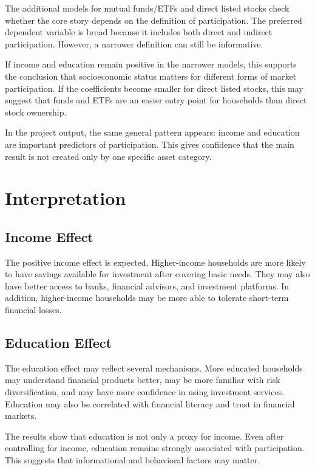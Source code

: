 \documentclass[12pt]{article}
\begin{document}
The additional models for mutual funds/ETFs and direct listed stocks check whether the core story depends on the definition of participation. The preferred dependent variable is broad because it includes both direct and indirect participation. However, a narrower definition can still be informative.

If income and education remain positive in the narrower models, this supports the conclusion that socioeconomic status matters for different forms of market participation. If the coefficients become smaller for direct listed stocks, this may suggest that funds and ETFs are an easier entry point for households than direct stock ownership.

In the project output, the same general pattern appears: income and education are important predictors of participation. This gives confidence that the main result is not created only by one specific asset category.

\section{Interpretation}

\subsection{Income Effect}

The positive income effect is expected. Higher-income households are more likely to have savings available for investment after covering basic needs. They may also have better access to banks, financial advisors, and investment platforms. In addition, higher-income households may be more able to tolerate short-term financial losses.

\subsection{Education Effect}

The education effect may reflect several mechanisms. More educated households may understand financial products better, may be more familiar with risk diversification, and may have more confidence in using investment services. Education may also be correlated with financial literacy and trust in financial markets.

The results show that education is not only a proxy for income. Even after controlling for income, education remains strongly associated with participation. This suggests that informational and behavioral factors may matter.
\end{document}
